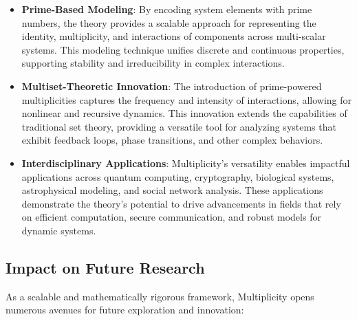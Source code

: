 \documentclass{article}
\begin{document}
\begin{itemize}
    \item \textbf{Prime-Based Modeling}: By encoding system elements with prime numbers, the theory provides a scalable approach for representing the identity, multiplicity, and interactions of components across multi-scalar systems. This modeling technique unifies discrete and continuous properties, supporting stability and irreducibility in complex interactions.
    
    \item \textbf{Multiset-Theoretic Innovation}: The introduction of prime-powered multiplicities captures the frequency and intensity of interactions, allowing for nonlinear and recursive dynamics. This innovation extends the capabilities of traditional set theory, providing a versatile tool for analyzing systems that exhibit feedback loops, phase transitions, and other complex behaviors.
    
    \item \textbf{Interdisciplinary Applications}: Multiplicity’s versatility enables impactful applications across quantum computing, cryptography, biological systems, astrophysical modeling, and social network analysis. These applications demonstrate the theory’s potential to drive advancements in fields that rely on efficient computation, secure communication, and robust models for dynamic systems.
\end{itemize}

\subsection{Impact on Future Research}

As a scalable and mathematically rigorous framework, Multiplicity opens numerous avenues for future exploration and innovation:
\end{document}
